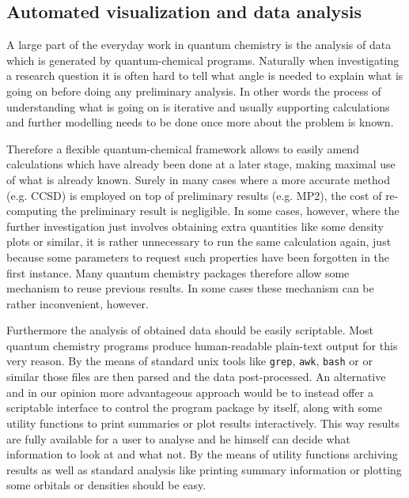 %




\subsection{Automated visualization and data analysis}
A large part of the everyday work in quantum chemistry
is the analysis of data which is generated by quantum-chemical programs.
Naturally when investigating a research question it is often
hard to tell what angle is needed to explain what is going on
before doing any preliminary analysis.
In other words the process of understanding what is going on is iterative
and usually supporting calculations and further modelling
needs to be done once more about the problem is known.

Therefore a flexible quantum-chemical framework allows to
easily amend calculations which have already been done
at a later stage, making maximal use of what is already known.
Surely in many cases where a more accurate method (e.g. CCSD) is employed
on top of preliminary results (e.g. MP2),
the cost of re-computing the preliminary result is negligible.
In some cases, however,
where the further investigation just involves obtaining
extra quantities like some density plots or similar,
it is rather unnecessary to run the same calculation again,
just because some parameters to request such properties
have been forgotten in the first instance.
Many quantum chemistry packages therefore allow
some mechanism to reuse previous results.
In some cases these mechanism can be rather inconvenient, however.

Furthermore the analysis of obtained data should be easily scriptable.
Most quantum chemistry programs produce human-readable plain-text output
for this very reason.
By the means of standard unix tools like \texttt{grep}, \texttt{awk},
\texttt{bash} or \python or similar those files are then parsed and
the data post-processed.
An alternative and in our opinion more advantageous approach
would be to instead offer a scriptable interface to control
the program package by itself,
along with some utility functions to print summaries
or plot results interactively.
This way results are fully available for a user to analyse
and he himself can decide what information to look at
and what not.
By the means of utility functions
archiving results as well as standard analysis
like printing summary information or plotting some orbitals or densities
should be easy.

